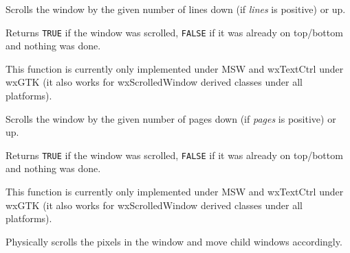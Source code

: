 \label{wxwindowscrolllines}


Scrolls the window by the given number of lines down (if {\it lines} is
positive) or up.


Returns {\tt TRUE} if the window was scrolled, {\tt FALSE} if it was already
on top/bottom and nothing was done.


This function is currently only implemented under MSW and wxTextCtrl under
wxGTK (it also works for wxScrolledWindow derived classes under all
platforms).



\label{wxwindowscrollpages}


Scrolls the window by the given number of pages down (if {\it pages} is
positive) or up.


Returns {\tt TRUE} if the window was scrolled, {\tt FALSE} if it was already
on top/bottom and nothing was done.


This function is currently only implemented under MSW and wxTextCtrl under
wxGTK (it also works for wxScrolledWindow derived classes under all
platforms).



\label{wxwindowscrollwindow}


Physically scrolls the pixels in the window and move child windows accordingly.





